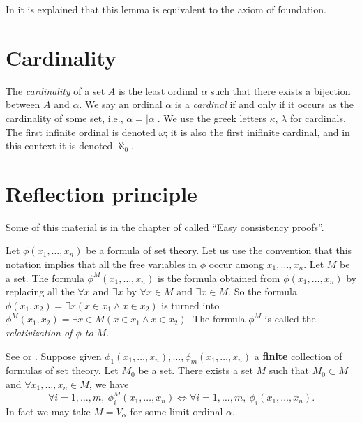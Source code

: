 \noindent
In \cite[Chapter III]{Kunen} it is explained that this lemma is
equivalent to the axiom of foundation.

\section{Cardinality}
\label{section-cardinals}

\noindent
The {\it cardinality} of a set $A$ is the least ordinal $\alpha$
such that there exists a bijection between $A$ and $\alpha$.
We say an ordinal $\alpha$ is a {\it cardinal} if and only
if it occurs as the cardinality of some set, i.e.,
$\alpha = |\alpha|$. We use the greek letters $\kappa$, $\lambda$
for cardinals. The first infinite ordinal is denoted $\omega$; it is
also the first inifinite cardinal, and in this context it is
denoted $\aleph_0$.

\section{Reflection principle}
\label{section-reflection-principle}

\noindent
Some of this material is in the chapter of \cite{Kunen} called
``Easy consistency proofs''.

\medskip\noindent
Let $\phi(x_1,\ldots,x_n)$ be a formula of set theory.
Let us use the convention that this notation implies that
all the free variables in $\phi$ occur among $x_1, \ldots, x_n$.
Let $M$ be a set.
The formula $\phi^M(x_1, \ldots, x_n)$ is the
formula obtained from $\phi(x_1, \ldots, x_n)$ by replacing all the
$\forall x$ and $\exists x$ by $\forall x\in M$ and $\exists x\in M$.
So the formula
$\phi(x_1,x_2) = \exists x (x\in x_1 \wedge x\in x_2)$
is turned  into
$\phi^M(x_1,x_2) = \exists x \in M (x\in x_1 \wedge x\in x_2)$.
The formula $\phi^M$ is called the {\it relativization of $\phi$
to $M$}.

\begin{theorem}
\label{theorem-reflection-principle}
See \cite[Theorem 12.14]{Jech} or \cite[Theorem 7.4]{Kunen}.
Suppose given $\phi_1(x_1, \ldots, x_n), \ldots, \phi_m(x_1, \ldots, x_n)$
a {\bf finite} collection of
formulas of set theory. Let $M_0$ be a set.
There exists a set $M$ such that
$M_0 \subset M$ and
$\forall x_1, \ldots, x_n \in M$, we have
$$
\forall i = 1, \ldots, m,\  
\phi_i^{M}(x_1,\ldots,x_n)
\Leftrightarrow
\forall i = 1, \ldots, m,\  
\phi_i(x_1,\ldots,x_n).
$$
In fact we may take $M = V_\alpha$ for some limit ordinal $\alpha$.
\end{theorem}


